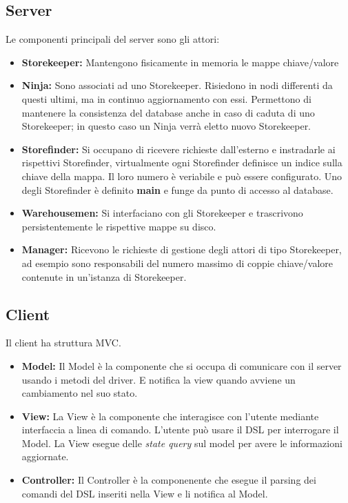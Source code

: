 \documentclass[a4paper]{article}
\begin{document}
		\subsection{Server}
        	Le componenti principali del server sono gli attori:
            \begin{itemize}
				\item \textbf{Storekeeper:} Mantengono fisicamente in memoria le mappe chiave/valore
                \item \textbf{Ninja:} Sono associati ad uno Storekeeper. Risiedono in nodi differenti da questi ultimi, ma in continuo aggiornamento con essi. Permettono di mantenere la consistenza del database anche in caso di caduta di uno Storekeeper; in questo caso un Ninja verrà eletto nuovo Storekeeper.
                \item \textbf{Storefinder:} Si occupano di ricevere richieste dall'esterno e instradarle ai rispettivi Storefinder, virtualmente ogni Storefinder definisce un indice sulla chiave della mappa. Il loro numero è veriabile e può essere configurato. Uno degli Storefinder è definito \textbf{main} e funge da punto di accesso al database.
                \item \textbf{Warehousemen:} Si interfaciano con gli Storekeeper e trascrivono persistentemente le rispettive mappe su disco.
                \item \textbf{Manager:} Ricevono le richieste di gestione degli attori di tipo Storekeeper, ad esempio sono responsabili del numero massimo di coppie chiave/valore contenute in un'istanza di Storekeeper.
			\end{itemize}
            
        \subsection{Client}
        	Il client ha struttura MVC.
            \begin{itemize}
				\item \textbf{Model:}
                	Il Model è la componente che si occupa di comunicare con il server usando i metodi del driver. E notifica la view quando avviene un cambiamento nel suo stato.
                \item \textbf{View:}
                	La View è la componente che interagisce con l'utente mediante interfaccia a linea di comando. L'utente può usare il DSL per interrogare il Model. La View esegue delle \emph{state query} sul model per avere le informazioni aggiornate.
                \item \textbf{Controller:}
                	Il Controller è la componenente che esegue il parsing dei comandi del DSL inseriti nella View e li notifica al Model.			
			\end{itemize}
        
\end{document}
